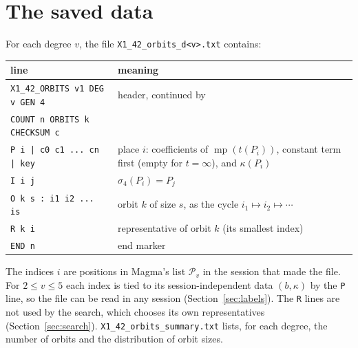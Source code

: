 \documentclass[11pt]{amsart}
\theoremstyle{definition}
\theoremstyle{remark}
\newcommand{\Pl}{\mathcal{P}}
\newcommand{\minpoly}{\operatorname{mp}}
\newcommand{\code}[1]{\texttt{#1}}
\begin{document}
\section{The saved data}

For each degree $v$, the file \code{X1\_42\_orbits\_d<v>.txt} contains:
\begin{center}\small
\begin{tabular}{@{}lp{}@{}}
\toprule
line & meaning\\\midrule
\code{X1\_42\_ORBITS v1 DEG v GEN 4} & header, continued by\\
\quad\code{COUNT n ORBITS k CHECKSUM c} & \\
\code{P i | c0 c1 ... cn | key} & place $i$: coefficients of $\minpoly(t(P_i))$, constant term first (empty for $t=\infty$), and $\kappa(P_i)$\\
\code{I i j} & $\sigma_4(P_i)=P_j$\\
\code{O k s : i1 i2 ... is} & orbit $k$ of size $s$, as the cycle $i_1\mapsto i_2\mapsto\cdots$\\
\code{R k i} & representative of orbit $k$ (its smallest index)\\
\code{END n} & end marker\\\bottomrule
\end{tabular}
\end{center}
The indices $i$ are positions in Magma's list $\Pl_v$ in the session that made the file. For $2\le v\le5$ each index is tied to its session-independent data $(b,\kappa)$ by the \code{P} line, so the file can be read in any session (Section~\ref{sec:labels}). The \code{R} lines are not used by the search, which chooses its own representatives (Section~\ref{sec:search}). \code{X1\_42\_orbits\_summary.txt} lists, for each degree, the number of orbits and the distribution of orbit sizes.
\end{document}
